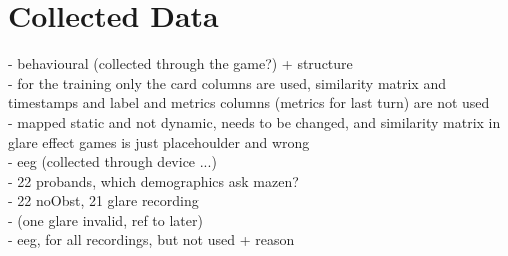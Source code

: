 \chapter{Collected Data}

- behavioural (collected through the game?) + structure\\
- for the training only the card columns are used, similarity matrix and timestamps and label and metrics columns (metrics for last turn) are not used\\
- mapped static and not dynamic, needs to be changed, and similarity matrix in glare effect games is just placehoulder and wrong\\
- eeg (collected through device ...)\\
- 22 probands, which demographics ask mazen?  \\
- 22 noObst, 21 glare recording \\
- (one glare invalid, ref to later)\\
- eeg, for all recordings, but not used + reason\\
